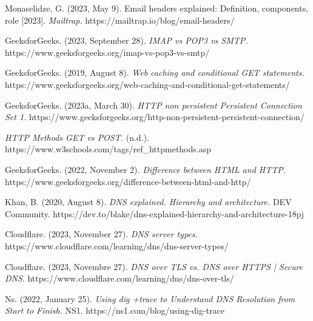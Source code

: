 \documentclass[spanish]{article}
\begin{document}
\begin{thebibliography}{X}

\item Monaselidze, G. (2023, May 9). Email headers
explained: Definition, components, role [2023].
\textit{Mailtrap.} https://mailtrap.io/blog/email-headers/\\

\item GeeksforGeeks. (2023, September 28). \textit{IMAP vs
POP3 vs SMTP.}
https://www.geeksforgeeks.org/imap-vs-pop3-vs-smtp/\\

\item GeeksforGeeks. (2019, August 8). \textit{Web caching
and conditional GET statements.}
https://www.geeksforgeeks.org/web-caching-and-conditional-get-statements/\\

\item GeeksforGeeks. (2023a, March 30). \textit{HTTP non
persistent Persistent Connection Set 1.}
https://www.geeksforgeeks.org/http-non-persistent-persistent-connection/\\

\item \textit{HTTP Methods GET vs POST.} (n.d.).
https://www.w3schools.com/tags/ref\_httpmethods.asp\\

\item GeeksforGeeks. (2022, November 2). \textit{Difference
between HTML and HTTP.}
https://www.geeksforgeeks.org/difference-between-html-and-http/\\

\item Khan, B. (2020, August 8). \textit{DNS explained.
Hierarchy and architecture.} DEV Community.
https://dev.to/blake/dns-explained-hierarchy-and-architecture-18pj\\

\item Cloudflare. (2023, November 27). \textit{DNS server
types.}
https://www.cloudflare.com/learning/dns/dns-server-types/\\

\item Cloudflare. (2023, Novembre 27). \textit{DNS over TLS
vs. DNS over HTTPS | Secure DNS}.
https://www.cloudflare.com/learning/dns/dns-over-tls/\\

\item Ns. (2022, January 25). \textit{Using dig +trace to
Understand DNS Resolution from Start to Finish.} NS1. https://ns1.com/blog/using-dig-trace


\end{thebibliography}
\end{document}
